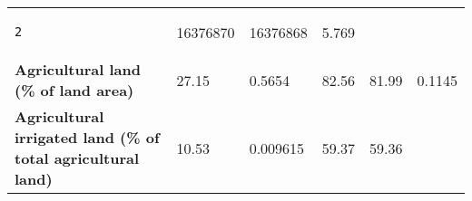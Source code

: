 \documentclass[
]{article}
\begin{document}
\begin{longtable}[]{@{}llllll@{}}
\begin{minipage}[t]{0.14\columnwidth}
\begin{verbatim}
2
\end{verbatim}
\strut
\end{minipage} & \begin{minipage}[t]{0.13\columnwidth}\raggedright
16376870\strut
\end{minipage} & \begin{minipage}[t]{0.13\columnwidth}\raggedright
16376868\strut
\end{minipage} & \begin{minipage}[t]{0.13\columnwidth}\raggedright
5.769\strut
\end{minipage}\tabularnewline
\begin{minipage}[t]{0.20\columnwidth}\raggedright
\textbf{Agricultural land (\% of land area)}\strut
\end{minipage} & \begin{minipage}[t]{0.12\columnwidth}\raggedright
27.15\strut
\end{minipage} & \begin{minipage}[t]{0.14\columnwidth}\raggedright
0.5654\strut
\end{minipage} & \begin{minipage}[t]{0.13\columnwidth}\raggedright
82.56\strut
\end{minipage} & \begin{minipage}[t]{0.13\columnwidth}\raggedright
81.99\strut
\end{minipage} & \begin{minipage}[t]{0.13\columnwidth}\raggedright
0.1145\strut
\end{minipage}\tabularnewline
\begin{minipage}[t]{0.20\columnwidth}\raggedright
\textbf{Agricultural irrigated land (\% of total agricultural
land)}\strut
\end{minipage} & \begin{minipage}[t]{0.12\columnwidth}\raggedright
10.53\strut
\end{minipage} & \begin{minipage}[t]{0.14\columnwidth}\raggedright
0.009615\strut
\end{minipage} & \begin{minipage}[t]{0.13\columnwidth}\raggedright
59.37\strut
\end{minipage} & \begin{minipage}[t]{0.13\columnwidth}\raggedright
59.36\strut
\end{minipage} & \begin{minipage}[t]{0.13\columnwidth}\raggedright

\end{minipage}
\end{longtable}
\end{document}
